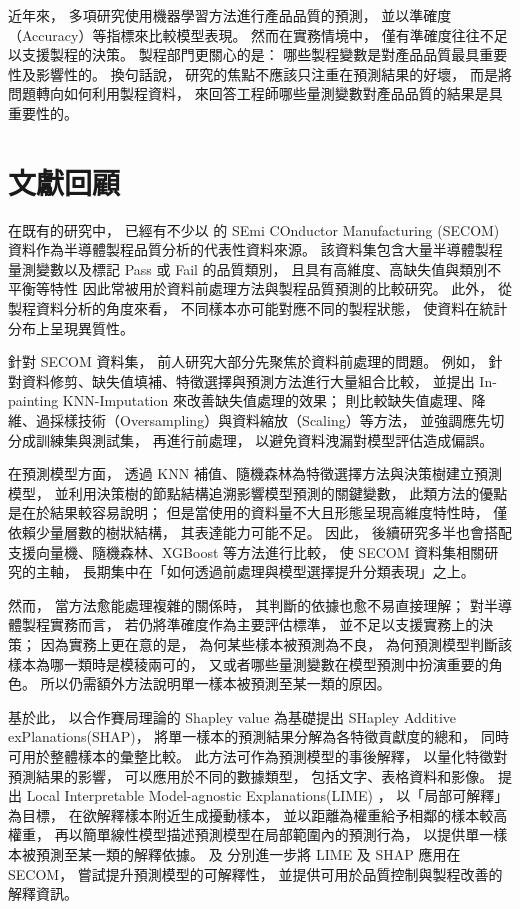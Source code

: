 \documentclass[12pt,a4paper,oneside]{book}
\begin{document}
	近年來，
	多項研究使用機器學習方法進行產品品質的預測，
	並以準確度（Accuracy）等指標來比較模型表現。
	然而在實務情境中，
	僅有準確度往往不足以支援製程的決策。
	製程部門更關心的是：
	哪些製程變數是對產品品質最具重要性及影響性的。
	換句話說，
	研究的焦點不應該只注重在預測結果的好壞，
	而是將問題轉向如何利用製程資料，
	來回答工程師哪些量測變數對產品品質的結果是具重要性的。
	
	\section{文獻回顧}
	在既有的研究中，
	已經有不少以 \cite{UCISECOM2008} 的 SEmi COnductor Manufacturing (SECOM)資料作為半導體製程品質分析的代表性資料來源。
	該資料集包含大量半導體製程量測變數以及標記 Pass 或 Fail 的品質類別，
	且具有高維度、高缺失值與類別不平衡等特性
	因此常被用於資料前處理方法與製程品質預測的比較研究。
	此外，
	從製程資料分析的角度來看，
	不同樣本亦可能對應不同的製程狀態，
	使資料在統計分布上呈現異質性。

	針對 SECOM 資料集，
	前人研究大部分先聚焦於資料前處理的問題。
	例如，
	\cite{Salem2018} 針對資料修剪、缺失值填補、特徵選擇與預測方法進行大量組合比較，
	並提出 In-painting KNN-Imputation 來改善缺失值處理的效果；
	\cite{Park2024} 則比較缺失值處理、降維、過採樣技術（Oversampling）與資料縮放（Scaling）等方法，
	並強調應先切分成訓練集與測試集，
	再進行前處理，
	以避免資料洩漏對模型評估造成偏誤。

	在預測模型方面，
	\cite{Lai2022} 透過 KNN 補值、隨機森林為特徵選擇方法與決策樹建立預測模型，
	並利用決策樹的節點結構追溯影響模型預測的關鍵變數，
	此類方法的優點是在於結果較容易說明；
	但是當使用的資料量不大且形態呈現高維度特性時，
	僅依賴少量層數的樹狀結構，
	其表達能力可能不足。
	因此，
	後續研究多半也會搭配支援向量機、隨機森林、XGBoost 等方法進行比較，
	使 SECOM 資料集相關研究的主軸，
	長期集中在「如何透過前處理與模型選擇提升分類表現」之上。

	然而，
	當方法愈能處理複雜的關係時，
	其判斷的依據也愈不易直接理解；
	對半導體製程實務而言，
	若仍將準確度作為主要評估標準，
	並不足以支援實務上的決策；
	因為實務上更在意的是，
	為何某些樣本被預測為不良，
	為何預測模型判斷該樣本為哪一類時是模稜兩可的，
	又或者哪些量測變數在模型預測中扮演重要的角色。
	所以仍需額外方法說明單一樣本被預測至某一類的原因。

	基於此，
	\cite{LundbergLee2017} 以合作賽局理論的 Shapley value 為基礎提出 SHapley Additive exPlanations(SHAP)，
	將單一樣本的預測結果分解為各特徵貢獻度的總和，
	同時可用於整體樣本的彙整比較。
	此方法可作為預測模型的事後解釋，
	以量化特徵對預測結果的影響，
	可以應用於不同的數據類型，
	包括文字、表格資料和影像。
	\cite{Ribeiro2016} 提出 Local Interpretable Model-agnostic Explanations(LIME) ，
	以「局部可解釋」為目標，
	在欲解釋樣本附近生成擾動樣本，
	並以距離為權重給予相鄰的樣本較高權重，
	再以簡單線性模型描述預測模型在局部範圍內的預測行為，
	以提供單一樣本被預測至某一類的解釋依據。
	\cite{Presciuttini2024} 及 \cite{Naudé2024} 分別進一步將 LIME 及 SHAP 應用在 SECOM，
	嘗試提升預測模型的可解釋性，
	並提供可用於品質控制與製程改善的解釋資訊。
	
\end{document}
